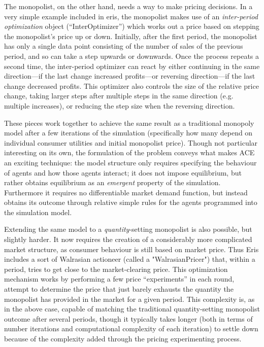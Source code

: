 \documentclass[12pt]{article}
\numberwithin{equation}{subsection}
\begin{document}
The monopolist, on the other hand, needs a way to make pricing decisions.  In a very simple example
included in eris, the monopolist makes use of an \emph{inter-period optimization} object
(``InterOptimizer'') which works out a price based on stepping the monopolist's price up or down.
Initially, after the first period, the monopolist has only a single data point consisting of the
number of sales of the previous period, and so can take a step upwards or downwards.  Once the
process repeats a second time, the inter-period optimizer can react by either continuing in the same
direction---if the last change increased profits---or reversing direction---if the last change
decreased profits.  This optimizer also controls the size of the relative price change, taking larger
steps after multiple steps in the same direction (e.g. multiple increases), or reducing the step
size when the reversing direction.

These pieces work together to achieve the same result as a traditional monopoly model after a few
iterations of the simulation (specifically how many depend on individual consumer utilities and
initial monopolist price).  Though not particular interesting on its own, the formulation of the
problem conveys what makes ACE an exciting technique: the model structure only requires specifying
the behaviour of agents and how those agents interact; it does not impose equilibrium, but rather
obtains equilibrium as an \emph{emergent} property of the simulation.  Furthermore it requires no
differentiable market demand function, but instead obtains its outcome through relative simple rules
for the agents programmed into the simulation model.

Extending the same model to a \emph{quantity}-setting monopolist is also possible, but slightly
harder.  It now requires the creation of a considerably more complicated market structure, as
consumer behaviour is still based on market price.  Thus Eris includes a sort of Walrasian actioneer
(called a "WalrasianPricer") that, within a period, tries to get close to the market-clearing price.
This optimization mechanism works by performing a few price ``experiments'' in each round, attempt
to determine the price that just barely exhausts the quantity the monopolist has provided in the
market for a given period.  This complexity is, as in the above case, capable of matching the
traditional quantity-setting monopolist outcome after several periods, though it typically takes
longer (both in terms of number iterations and computational complexity of each iteration) to settle
down because of the complexity added through the pricing experimenting process.
\end{document}
